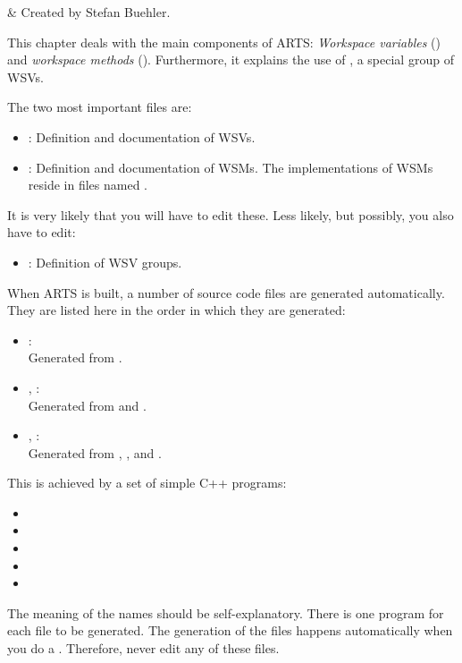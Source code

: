 
\label{sec:agendas}

 & Created by Stefan Buehler.\\
\stophistory

This chapter deals with the main components of ARTS: \emph{Workspace
  variables} () and
\emph{workspace methods} ().
Furthermore, it explains the use of , a special
group of WSVs.

\label{sec:agendas:files}

The two most important files are:
\begin{itemize}
\item {}: Definition and documentation of WSVs.
\item{}: Definition and documentation of WSMs. The
  implementations of WSMs reside in files named
  .
\end{itemize}
It is very likely that you will have to edit these. Less likely, but
possibly, you also have to edit:
\begin{itemize}
\item {}: Definition of WSV groups.
\end{itemize}

\vspace{2ex}
When ARTS is built, a number of source code files are generated
automatically. They are listed here in the order in which they are
generated: 
\begin{itemize}
\item {}:\\
  Generated from .
\item {}, :\\
  Generated from  and . 
\item {}, :\\
  Generated from ,
  , and .
\end{itemize}
This is achieved by a set of simple C++ programs:
\begin{itemize}
\item {}
\item {}
\item {}
\item {}
\item {}
\end{itemize}
The meaning of the names should be self-explanatory. There is one program
for each file to be generated.  The generation of the
 files happens automatically when you do a
. Therefore, never edit any of these files.

